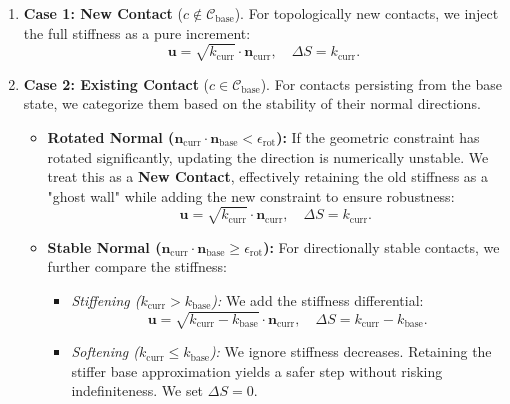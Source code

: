 \documentclass[acmtog,anonymous,review,screen,nonacm]{acmart}
\begin{document}
\begin{enumerate}[leftmargin=*]
    \item \textbf{Case 1: New Contact} ($c \notin \mathcal{C}_{\text{base}}$).
    For topologically new contacts, we inject the full stiffness as a pure increment:
    \begin{equation}
        \mathbf{u} = \sqrt{k_{\text{curr}}} \cdot \mathbf{n}_{\text{curr}}, \quad \Delta S = k_{\text{curr}}.
    \end{equation}

    \item \textbf{Case 2: Existing Contact} ($c \in \mathcal{C}_{\text{base}}$).
    For contacts persisting from the base state, we categorize them based on the stability of their normal directions.
    \begin{itemize}[leftmargin=*, label={$\bullet$}]
        \item \textbf{Rotated Normal ($\mathbf{n}_{\text{curr}} \cdot \mathbf{n}_{\text{base}} < \epsilon_{\text{rot}}$):}
        If the geometric constraint has rotated significantly, updating the direction is numerically unstable. We treat this as a \textbf{New Contact}, effectively retaining the old stiffness as a "ghost wall" while adding the new constraint to ensure robustness:
        \begin{equation}
            \mathbf{u} = \sqrt{k_{\text{curr}}} \cdot \mathbf{n}_{\text{curr}}, \quad \Delta S = k_{\text{curr}}.
        \end{equation}

        \item \textbf{Stable Normal ($\mathbf{n}_{\text{curr}} \cdot \mathbf{n}_{\text{base}} \ge \epsilon_{\text{rot}}$):}
        For directionally stable contacts, we further compare the stiffness:
        \begin{itemize}[leftmargin=*, label={$-$}]
            \item \textit{Stiffening ($k_{\text{curr}} > k_{\text{base}}$):} We add the stiffness differential:
            \begin{equation}
                \mathbf{u} = \sqrt{k_{\text{curr}} - k_{\text{base}}} \cdot \mathbf{n}_{\text{curr}}, \quad \Delta S = k_{\text{curr}} - k_{\text{base}}.
            \end{equation}
            \item \textit{Softening ($k_{\text{curr}} \le k_{\text{base}}$):} We ignore stiffness decreases. Retaining the stiffer base approximation yields a safer step without risking indefiniteness. We set $\Delta S = 0$.
        \end{itemize}
    \end{itemize}
\end{enumerate}
\end{document}
